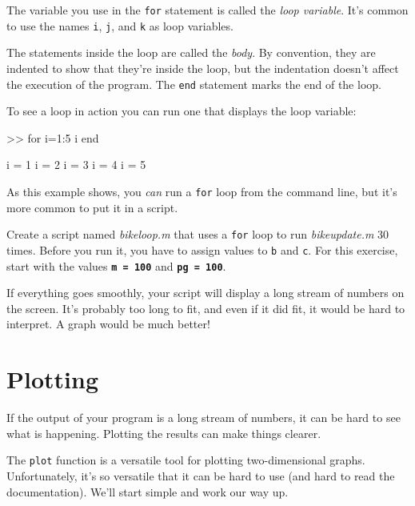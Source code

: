 The variable you use in the \lstinline{for} statement is called the \emph{loop
variable}.  It's common to use the names \lstinline{i},
\lstinline{j}, and \lstinline{k} as loop variables.


The statements inside the loop are called the \emph{body}.  By convention,
they are indented to show that they're inside the loop, but the
indentation doesn't affect the execution of the program.
The \lstinline{end} statement marks the end of the loop.


To see a loop in action you can run one that displays the
loop variable:

\begin{code}
>> for i=1:5
    i
end

i = 1
i = 2
i = 3
i = 4
i = 5
\end{code}

As this example shows, you \emph{can} run a \lstinline{for} loop from the
command line, but it's more common to put it in a script.

\begin{ex}
Create a script named \emph{bike\textunderscore loop.m} that uses a \lstinline{for} loop to run \emph{bike\textunderscore update.m} 30 times.  Before you run it, you have to assign values to \lstinline{b} and \lstinline{c}.
For this exercise, start with the values \textbf{\lstinline{m = 100}} and \textbf{\lstinline{pg = 100}}.

If everything goes smoothly, your script will display a long stream
of numbers on the screen.  It's probably too long
to fit, and even if it did fit, it would be hard to interpret.
A graph would be much better!
\end{ex}



\section{Plotting}
\label{plotting}


If the output of your program is a long stream of numbers, it can be hard to see what is happening.
Plotting the results can make things clearer.

The \lstinline{plot} function is a versatile tool for plotting two-dimensional graphs.  Unfortunately, it's so versatile that it can be hard to use (and hard to read the documentation).
We'll start simple and work our way up.

